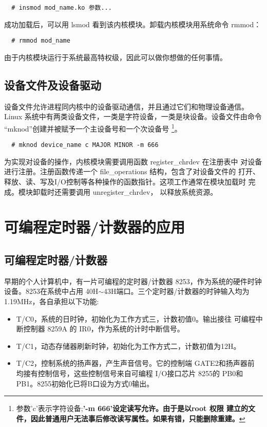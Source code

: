 \begin{verbatim}
  # insmod mod_name.ko 参数...
\end{verbatim}

成功加载后，可以用 lsmod 看到该内核模块。卸载内核模块用系统命令 rmmod：

\begin{verbatim}
  # rmmod mod_name
\end{verbatim}

由于内核模块运行于系统最高特权级，因此可以做你想做的任何事情。
\subsection{设备文件及设备驱动}
    设备文件允许进程同内核中的设备驱动通信，并且通过它们和物理设备通信。
Linux 系统中有两类设备文件，一类是字符设备，一类是块设备。设备文件由命令
``mknod''创建并被赋予一个主设备号和一个次设备号
\footnote{参数'c'表示字符设备;{\bf '-m 666'设定读写允许。由于是以root 权限
建立的文件，因此普通用户无法事后修改读写属性。如果有错，只能删除重建。}}。
\begin{verbatim}
  # mknod device_name c MAJOR MINOR -m 666
\end{verbatim}

    为实现对设备的操作，内核模块需要调用函数 register\_chrdev 在注册表中
对设备进行注册。注册函数传递一个 file\_operations 结构，包含了对设备文件的
打开、释放、读、写及I/O控制等各种操作的函数指针。这项工作通常在模块加载时
完成。模块卸载时还需要调用 unregister\_chrdev， 以释放系统资源。

\section{可编程定时器/计数器的应用}
\subsection{可编程定时器/计数器}
    早期的个人计算机中，有一片可编程的定时器/计数器 8253，作为系统的硬件时钟
设备。8253在系统中占用 40H$\sim$43H端口。三个定时器/计数器的时钟输入均为
1.19MHz，各自承担以下功能:
\begin{itemize}
  \item T/C0，系统的日时钟，初始化为工作方式三，计数初值0。输出接往
        可编程中断控制器 8259A 的 IR0，作为系统的计时中断信号。
  \item T/C1，动态存储器刷新时钟，初始化为工作方式二，计数初值为12H。
  \item T/C2，控制系统的扬声器，产生声音信号。它的控制端 GATE2和扬声器前
        均接有控制信号，这些控制信号来自可编程 I/O接口芯片 8255的
        PB0和 PB1。8255初始化已将B口设为方式0输出。
\end{itemize}

